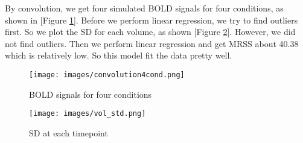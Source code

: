 
\par By convolution, we get four simulated BOLD signals for four
conditions, as shown in [Figure \ref{fig:convolution}]. Before we perform linear regression, we try to find outliers first. So we plot the SD for each volume, as shown [Figure \ref{fig:VolumeSD}]. However, we did not find outliers. Then we perform linear regression and get MRSS about 40.38 which is relatively low. So this model fit the data pretty well. 

\begin{figure}[h!]
\centering
\texttt{[image: images/convolution4cond.png]}
\caption{BOLD signals for four conditions}
\label{fig:convolution}
\end{figure}

\begin{figure}[h!]
\centering
\texttt{[image: images/vol\_std.png]}               
\caption{SD at each timepoint}
\label{fig:VolumeSD}
\end{figure}
